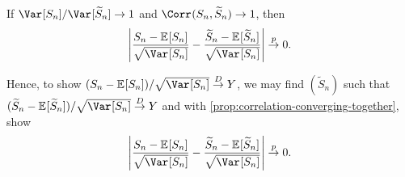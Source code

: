 \begin{proposition}\label{prop:correlation-converging-together}
	If \(\Var_{}[S_n] / \Var_{}[\widetilde{S} _n] \to 1\) and \(\Corr_{}(S_n, \widetilde{S} _n) \to 1\), then
	\[
		\left\vert \frac{S_n - \mathbb{E}_{}[S_n] }{\sqrt{\Var_{}[S_n] } } - \frac{\widetilde{S} _n - \mathbb{E}_{}[\widetilde{S} _n] }{\sqrt{\Var_{}[S_n] } } \right\vert
		\overset{p}{\to} 0.
	\]
\end{proposition}

Hence, to show \((S_n - \mathbb{E}_{}[S_n] ) / \sqrt{\Var_{}[S_n] } \overset{D}{\to} Y\), we may find \((\widetilde{S} _n)\) such that \((\widetilde{S} _n - \mathbb{E}_{}[\widetilde{S} _n]) / \sqrt{\Var_{}[S_n] } \overset{D}{\to} Y\) and with \autoref{prop:correlation-converging-together}, show
\[
	\left\vert \frac{S_n - \mathbb{E}_{}[S_n] }{\sqrt{\Var_{}[S_n] } } - \frac{\widetilde{S} _n - \mathbb{E}_{}[\widetilde{S} _n] }{\sqrt{\Var_{}[S_n] } }\right\vert
	\overset{p}{\to} 0.
\]